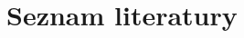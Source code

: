 \documentclass[main.tex]{subfiles}
\begin{document}
\fontsize{10pt}{10pt}\selectfont\setlength\parindent{0em}
\section*{Seznam literatury}
\localtableofcontents

\ispageodd
\newpage
\end{document}
